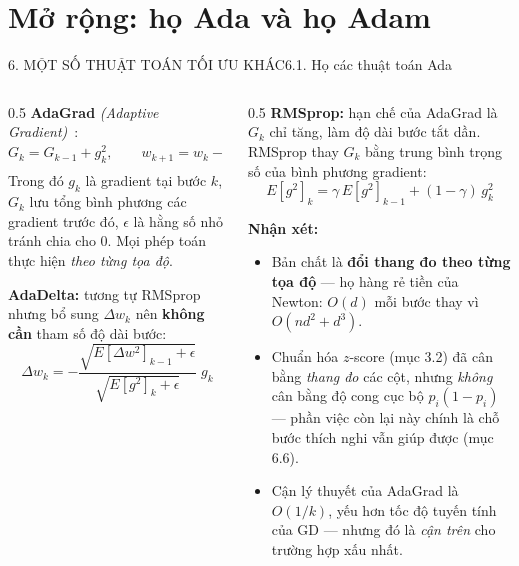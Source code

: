 \documentclass[aspectratio=169,11pt]{beamer}
\newcommand{\nx}{\textbf{Nhận xét:}}
\begin{document}
\section{Mở rộng: họ Ada và họ Adam}

\begin{frame}{6. MỘT SỐ THUẬT TOÁN TỐI ƯU KHÁC}{6.1. Họ các thuật toán Ada}
  \label{sec:6}%
  \footnotesize
  \begin{columns}[T]
    \begin{column}{0.5\textwidth}
      \textbf{AdaGrad} \textit{(Adaptive Gradient)}~\cite{duchi2011adagrad}:
      \[
        G_k=G_{k-1}+g_k^2,\qquad
        w_{k+1}=w_k-\frac{\eta}{\sqrt{G_k}+\epsilon}\,g_k
      \]
      Trong đó $g_k$ là gradient tại bước $k$, $G_k$ lưu tổng bình phương các gradient trước đó,
      $\epsilon$ là hằng số nhỏ tránh chia cho 0. Mọi phép toán thực hiện \emph{theo từng tọa độ}.
      \vspace{6pt}

      \textbf{AdaDelta:} tương tự RMSprop nhưng bổ sung $\Delta w_k$ nên \textbf{không cần} tham số
      độ dài bước:
      \[
        \Delta w_k=-\frac{\sqrt{E[\Delta w^2]_{k-1}+\epsilon}}{\sqrt{E[g^2]_k+\epsilon}}\;g_k
      \]
    \end{column}
    \begin{column}{0.5\textwidth}
      \textbf{RMSprop:} hạn chế của AdaGrad là $G_k$ chỉ tăng, làm độ dài bước tắt dần.
      RMSprop thay $G_k$ bằng trung bình trọng số của bình phương gradient:
      \[
        E[g^2]_k=\gamma\,E[g^2]_{k-1}+(1-\gamma)\,g_k^2
      \]
      \vspace{6pt}

      \nx{}
      \begin{itemize}\scriptsize
        \item Bản chất là \textbf{đổi thang đo theo từng tọa độ} — họ hàng rẻ tiền của Newton:
              $O(d)$ mỗi bước thay vì $O(nd^2{+}d^3)$.
        \item Chuẩn hóa $z$-score (mục 3.2) đã cân bằng \emph{thang đo} các cột, nhưng
              \emph{không} cân bằng độ cong cục bộ $p_i(1-p_i)$ — phần việc còn lại này
              chính là chỗ bước thích nghi vẫn giúp được (mục 6.6).
        \item Cận lý thuyết của AdaGrad là $O(1/k)$, yếu hơn tốc độ tuyến tính của GD —
              nhưng đó là \emph{cận trên} cho trường hợp xấu nhất.
      \end{itemize}
    \end{column}
  \end{columns}
\end{frame}
\end{document}
